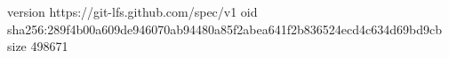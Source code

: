 version https://git-lfs.github.com/spec/v1
oid sha256:289f4b00a609de946070ab94480a85f2abea641f2b836524ecd4c634d69bd9cb
size 498671
